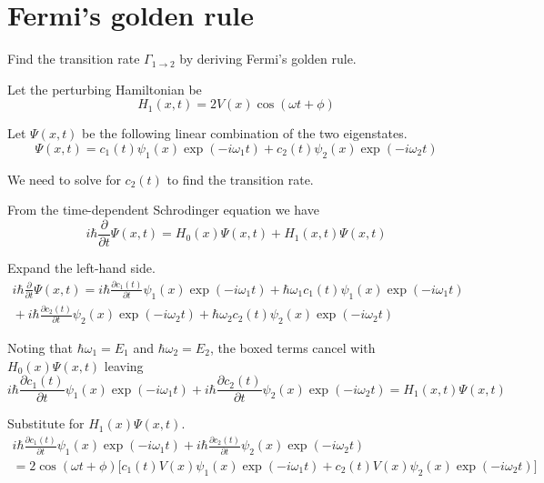 

\section*{Fermi's golden rule}

Find the transition rate $\Gamma_{1\rightarrow2}$
by deriving Fermi's golden rule.

\bigskip

Let the perturbing Hamiltonian be
\begin{equation*}
H_1(x,t)=2V(x)\cos(\omega t+\phi)
\end{equation*}

Let $\Psi(x,t)$ be the following linear combination of the two eigenstates.
\begin{equation*}
\Psi(x,t)=c_1(t)\psi_1(x)\exp(-i\omega_1t)+c_2(t)\psi_2(x)\exp(-i\omega_2t)
\end{equation*}

We need to solve for $c_2(t)$ to find the transition rate.

\bigskip

From the time-dependent Schrodinger equation we have
\begin{equation*}
i\hbar\frac{\partial}{\partial t}\Psi(x,t)=H_0(x)\Psi(x,t)+H_1(x,t)\Psi(x,t)
\end{equation*}

Expand the left-hand side.
\begin{multline*}
i\hbar\frac{\partial}{\partial t}\Psi(x,t)
=i\hbar\frac{\partial c_1(t)}{\partial t}\psi_1(x)\exp(-i\omega_1t)
+\boxed{\hbar\omega_1c_1(t)\psi_1(x)\exp(-i\omega_1t)}
\\
{}+i\hbar\frac{\partial c_2(t)}{\partial t}\psi_2(x)\exp(-i\omega_2t)
+\boxed{\hbar\omega_2c_2(t)\psi_2(x)\exp(-i\omega_2t)}
\end{multline*}

Noting that $\hbar\omega_1=E_1$ and $\hbar\omega_2=E_2$,
the boxed terms cancel with $H_0(x)\Psi(x,t)$ leaving
\begin{equation*}
i\hbar\frac{\partial c_1(t)}{\partial t}\psi_1(x)\exp(-i\omega_1t)
+i\hbar\frac{\partial c_2(t)}{\partial t}\psi_2(x)\exp(-i\omega_2t)
=H_1(x,t)\Psi(x,t)
\end{equation*}

Substitute for $H_1(x)\Psi(x,t)$.
\begin{multline*}
i\hbar\frac{\partial c_1(t)}{\partial t}\psi_1(x)\exp(-i\omega_1t)
+i\hbar\frac{\partial c_2(t)}{\partial t}\psi_2(x)\exp(-i\omega_2t)
\\
{}=2\cos(\omega t+\phi)
\biggl[
c_1(t)V(x)\psi_1(x)\exp(-i\omega_1t)+c_2(t)V(x)\psi_2(x)\exp(-i\omega_2t)
\biggr]
\end{multline*}

